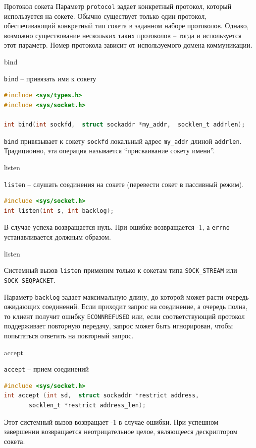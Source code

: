 \begin{frame}{Протокол сокета}
Параметр {\tt protocol} задает конкретный протокол, который используется на сокете. 
Обычно существует только один протокол, обеспечивающий конкретный тип сокета в 
заданном наборе протоколов. Однако, возможно существование нескольких таких 
протоколов -- тогда и используется этот параметр. 
Номер протокола зависит от используемого домена коммуникации.
\end{frame}

\begin{frame}[fragile]{bind}

{\tt bind} -- привязать имя к сокету
\scriptsize\begin{lstlisting}[language=C]
#include <sys/types.h>
#include <sys/socket.h>

int bind(int sockfd,  struct sockaddr *my_addr,  socklen_t addrlen);
\end{lstlisting}
{\tt bind} привязывает  к  сокету  {\tt sockfd} локальный адрес {\tt my\_addr} длиной {\tt addrlen}.  Традиционно, эта операция называется ``присваивание сокету имени''.
\end{frame}

\begin{frame}[fragile]{listen}

{\tt listen} -- слушать соединения на сокете (перевести сокет в пассивный режим).

\scriptsize\begin{lstlisting}[language=C]
#include <sys/socket.h> 
int listen(int s, int backlog);   
\end{lstlisting}
В случае успеха возвращается нуль. 
При ошибке возвращается -1, а {\tt errno} устанавливается должным образом.
\end{frame}

\begin{frame}{listen}

Системный вызов {\tt listen} применим 
только к сокетам типа {\tt SOCK\_STREAM} или {\tt SOCK\_SEQPACKET}.

Параметр {\tt backlog} задает максимальную длину, до которой может расти очередь 
ожидающих соединений. Если приходит запрос на соединение, а очередь полна,
то клиент получит ошибку {\tt ECONNREFUSED} или, если соответствующий
протокол поддерживает повторную передачу, запрос может быть игнорирован,
чтобы попытаться ответить на повторный запрос.   
\end{frame}

\begin{frame}[fragile]{accept}

{\tt accept} -- прием соединений
\scriptsize\begin{lstlisting}[language=C]
#include <sys/socket.h>
int accept (int sd,  struct sockaddr *restrict address, 
       socklen_t *restrict address_len);
\end{lstlisting}
Этот системный вызов возвращает -1 в случае  ошибки.   При  успешном  завершении  возвращается  неотрицательное целое,  являющееся дескриптором сокета.
\end{frame}

